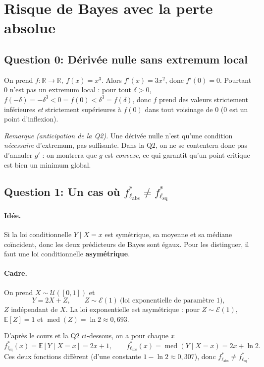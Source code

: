 \documentclass[11pt,a4paper]{article}
\newcommand{\R}{\mathbb{R}}
\newcommand{\E}{\mathbb{E}}
\newcommand{\fstar}{f^{*}}
\DeclareMathOperator{\med}{med}
\theoremstyle{plain}
\begin{document}
\section{Risque de Bayes avec la perte absolue}

\subsection*{Question 0: Dérivée nulle sans extremum local}

On prend $f:\R\to\R,\ f(x)=x^3$. Alors $f'(x)=3x^2$, donc $f'(0)=0$. Pourtant
$0$ n'est pas un extremum local : pour tout $\delta>0$, $f(-\delta)=-\delta^3<0=f(0)<\delta^3=f(\delta)$,
donc $f$ prend des valeurs strictement inférieures \emph{et} strictement
supérieures à $f(0)$ dans tout voisinage de $0$ ($0$ est un point d'inflexion).

\medskip
\noindent\emph{Remarque (anticipation de la Q2).} Une dérivée nulle n'est qu'une
condition \emph{nécessaire} d'extremum, pas suffisante. Dans la Q2, on ne se
contentera donc pas d'annuler $g'$ : on montrera que $g$ est \emph{convexe},
ce qui garantit qu'un point critique est bien un minimum global.

\subsection*{Question 1: Un cas où $\fstar_{\ell_\text{abs}}\neq\fstar_{\ell_\text{sq}}$}

\paragraph{Idée.} Si la loi conditionnelle $Y\mid X=x$ est symétrique, sa moyenne
et sa médiane coïncident, donc les deux prédicteurs de Bayes sont égaux. Pour les
distinguer, il faut une loi conditionnelle \textbf{asymétrique}.

\paragraph{Cadre.} On prend $X\sim\mathcal{U}([0,1])$ et
\[
    Y=2X+Z,\qquad Z\sim\mathcal{E}(1)\ \text{(loi exponentielle de paramètre 1)},
\]
$Z$ indépendant de $X$. La loi exponentielle est asymétrique : pour $Z\sim\mathcal{E}(1)$,
$\E[Z]=1$ et $\med(Z)=\ln 2\approx 0{,}693$.

D'après le cours et la Q2 ci-dessous, on a pour chaque $x$
\[
    \fstar_{\ell_\text{sq}}(x)=\E[Y\mid X=x]=2x+1,
    \qquad
    \fstar_{\ell_\text{abs}}(x)=\med(Y\mid X=x)=2x+\ln 2 .
\]
Ces deux fonctions diffèrent (d'une constante $1-\ln2\approx0{,}307$), donc
$\fstar_{\ell_\text{abs}}\neq\fstar_{\ell_\text{sq}}$.
\end{document}
